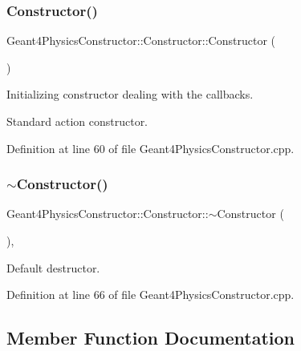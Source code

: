 \subsubsection{\texorpdfstring{Constructor()}{Constructor()}}
{\footnotesize\ttfamily Geant4\+Physics\+Constructor\+::\+Constructor\+::\+Constructor (\begin{DoxyParamCaption}{ }\end{DoxyParamCaption})\hspace{0.3cm}{\ttfamily [protected]}}



Initializing constructor dealing with the callbacks. 

Standard action constructor. 

Definition at line 60 of file Geant4\+Physics\+Constructor.\+cpp.

\hypertarget{class_d_d4hep_1_1_simulation_1_1_geant4_physics_constructor_1_1_constructor_a9b97bd3101cbf16f3ff03b382763c3a0}{}\label{class_d_d4hep_1_1_simulation_1_1_geant4_physics_constructor_1_1_constructor_a9b97bd3101cbf16f3ff03b382763c3a0} 
\subsubsection{\texorpdfstring{$\sim$\+Constructor()}{~Constructor()}}
{\footnotesize\ttfamily Geant4\+Physics\+Constructor\+::\+Constructor\+::$\sim$\+Constructor (\begin{DoxyParamCaption}{ }\end{DoxyParamCaption})\hspace{0.3cm}{\ttfamily [protected]}, {\ttfamily [virtual]}}



Default destructor. 



Definition at line 66 of file Geant4\+Physics\+Constructor.\+cpp.



\subsection{Member Function Documentation}
\hypertarget{class_d_d4hep_1_1_simulation_1_1_geant4_physics_constructor_1_1_constructor_a53dfd498fc3e9a35224537d9706849d7}{}\label{class_d_d4hep_1_1_simulation_1_1_geant4_physics_constructor_1_1_constructor_a53dfd498fc3e9a35224537d9706849d7} 
